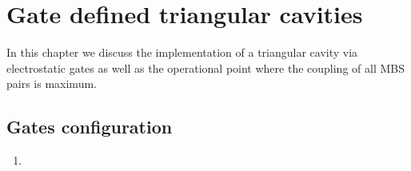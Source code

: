 \chapter{Gate defined triangular cavities}
In this chapter we discuss the implementation of a triangular cavity via electrostatic gates as well as the operational point where the coupling of all MBS pairs is maximum.
\section{Gates configuration}
\begin{enumerate}
\item 
\end{enumerate}